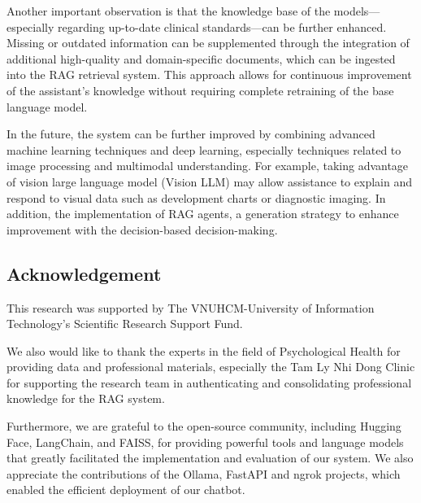 \documentclass[runningheads]{llncs}
\begin{document}
Another important observation is that the knowledge base of the models—especially regarding up-to-date clinical standards—can be further enhanced. Missing or outdated information can be supplemented through the integration of additional high-quality and domain-specific documents, which can be ingested into the RAG retrieval system. This approach allows for continuous improvement of the assistant's knowledge without requiring complete retraining of the base language model.

In the future, the system can be further improved by combining advanced machine learning techniques and deep learning, especially techniques related to image processing and multimodal understanding. For example, taking advantage of vision large language model (Vision LLM) may allow assistance to explain and respond to visual data such as development charts or diagnostic imaging. In addition, the implementation of RAG agents, a generation strategy to enhance improvement with the decision-based decision-making.

\subsection{Acknowledgement}

This research was supported by The VNUHCM-University of Information Technology’s Scientific Research Support Fund.

We also would like to thank the experts in the field of Psychological Health for providing data and professional materials, especially the Tam Ly Nhi Dong Clinic for supporting the research team in authenticating and consolidating professional knowledge for the RAG system.

Furthermore, we are grateful to the open-source community, including Hugging Face, LangChain, and FAISS, for providing powerful tools and language models that greatly facilitated the implementation and evaluation of our system. We also appreciate the contributions of the Ollama, FastAPI and ngrok projects, which enabled the efficient deployment of our chatbot.
\end{document}
